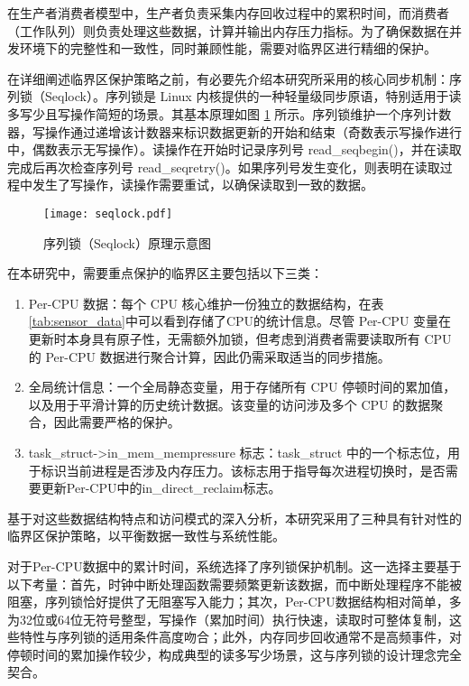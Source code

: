 在生产者消费者模型中，生产者负责采集内存回收过程中的累积时间，而消费者（工作队列）则负责处理这些数据，计算并输出内存压力指标。为了确保数据在并发环境下的完整性和一致性，同时兼顾性能，需要对临界区进行精细的保护。

在详细阐述临界区保护策略之前，有必要先介绍本研究所采用的核心同步机制：序列锁（Seqlock）。序列锁是 Linux 内核提供的一种轻量级同步原语，特别适用于读多写少且写操作简短的场景。其基本原理如图 \ref{fig:seqlock} 所示。序列锁维护一个序列计数器，写操作通过递增该计数器来标识数据更新的开始和结束（奇数表示写操作进行中，偶数表示无写操作）。读操作在开始时记录序列号 read\_seqbegin()，并在读取完成后再次检查序列号 read\_seqretry()。如果序列号发生变化，则表明在读取过程中发生了写操作，读操作需要重试，以确保读取到一致的数据。

\begin{figure}[H]
    \centering
    \texttt{[image: seqlock.pdf]}
    \caption{序列锁（Seqlock）原理示意图}
    \label{fig:seqlock}
\end{figure}

在本研究中，需要重点保护的临界区主要包括以下三类：

\begin{enumerate}
    \item  Per-CPU 数据：每个 CPU 核心维护一份独立的数据结构，在表\ref{tab:sensor_data}中可以看到存储了CPU的统计信息。尽管 Per-CPU 变量在更新时本身具有原子性，无需额外加锁，但考虑到消费者需要读取所有 CPU 的 Per-CPU 数据进行聚合计算，因此仍需采取适当的同步措施。
    \item 全局统计信息：一个全局静态变量，用于存储所有 CPU 停顿时间的累加值，以及用于平滑计算的历史统计数据。该变量的访问涉及多个 CPU 的数据聚合，因此需要严格的保护。
    \item task\_struct->in\_mem\_mempressure 标志：task\_struct 中的一个标志位，用于标识当前进程是否涉及内存压力。该标志用于指导每次进程切换时，是否需要更新Per-CPU中的in\_direct\_reclaim标志。
\end{enumerate}

基于对这些数据结构特点和访问模式的深入分析，本研究采用了三种具有针对性的临界区保护策略，以平衡数据一致性与系统性能。

对于Per-CPU数据中的累计时间，系统选择了序列锁保护机制。这一选择主要基于以下考量：首先，时钟中断处理函数需要频繁更新该数据，而中断处理程序不能被阻塞，序列锁恰好提供了无阻塞写入能力；其次，Per-CPU数据结构相对简单，多为32位或64位无符号整型，写操作（累加时间）执行快速，读取时可整体复制，这些特性与序列锁的适用条件高度吻合；此外，内存同步回收通常不是高频事件，对停顿时间的累加操作较少，构成典型的读多写少场景，这与序列锁的设计理念完全契合。

